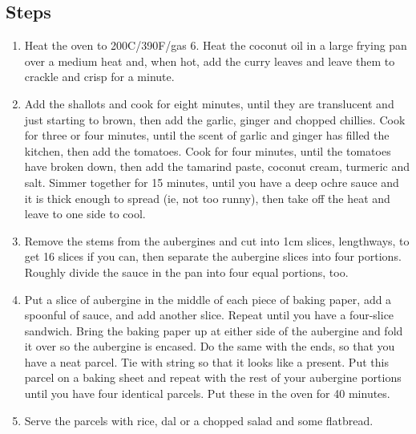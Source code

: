 \documentclass{book}
\begin{document}
\subsection*{Steps}
\begin{enumerate}
\item Heat the oven to 200C/390F/gas 6. Heat the coconut oil in a large frying pan over a medium heat and, when hot, add the curry leaves and leave them to crackle and crisp for a minute.
\item Add the shallots and cook for eight minutes, until they are translucent and just starting to brown, then add the garlic, ginger and chopped chillies. Cook for three or four minutes, until the scent of garlic and ginger has filled the kitchen, then add the tomatoes. Cook for four minutes, until the tomatoes have broken down, then add the tamarind paste, coconut cream, turmeric and salt. Simmer together for 15 minutes, until you have a deep ochre sauce and it is thick enough to spread (ie, not too runny), then take off the heat and leave to one side to cool.
\item Remove the stems from the aubergines and cut into 1cm slices, lengthways, to get 16 slices if you can, then separate the aubergine slices into four portions. Roughly divide the sauce in the pan into four equal portions, too.
\item Put a slice of aubergine in the middle of each piece of baking paper, add a spoonful of sauce, and add another slice. Repeat until you have a four-slice sandwich. Bring the baking paper up at either side of the aubergine and fold it over so the aubergine is encased. Do the same with the ends, so that you have a neat parcel. Tie with string so that it looks like a present. Put this parcel on a baking sheet and repeat with the rest of your aubergine portions until you have four identical parcels. Put these in the oven for 40 minutes.
\item Serve the parcels with rice, dal or a chopped salad and some flatbread.
\end{enumerate}
\newpage
\end{document}
